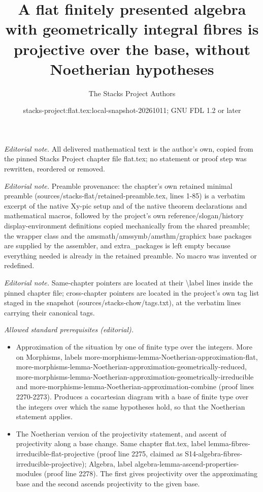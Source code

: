 \documentclass[10pt,a4paper]{amsart}
\title{A flat finitely presented algebra with geometrically integral fibres is projective over the base, without Noetherian hypotheses}
\author{The Stacks Project Authors}
\date{stacks-project:flat.tex:local-snapshot-20261011; GNU FDL 1.2 or later}
\theoremstyle{plain}
\theoremstyle{definition}
\theoremstyle{remark}
\numberwithin{equation}{subsection}
\begin{document}
\maketitle
\noindent\textit{Editorial note.} All delivered mathematical text is the author's own, copied from the pinned Stacks Project chapter file flat.tex; no statement or proof step was rewritten, reordered or removed.\par\medskip
\noindent\textit{Editorial note.} Preamble provenance: the chapter's own retained minimal preamble (sources/stacks-flat/retained-preamble.tex, lines 1-85) is a verbatim excerpt of the native Xy-pic setup and of the native theorem declarations and mathematical macros, followed by the project's own reference/slogan/history display-environment definitions copied mechanically from the shared preamble; the wrapper class and the amsmath/amssymb/amsthm/graphicx base packages are supplied by the assembler, and extra\_packages is left empty because everything needed is already in the retained preamble. No macro was invented or redefined.\par\medskip
\noindent\textit{Editorial note.} Same-chapter pointers are located at their \textbackslash{}label lines inside the pinned chapter file; cross-chapter pointers are located in the project's own tag list staged in the snapshot (sources/stacks-chow/tags.txt), at the verbatim lines carrying their canonical tags.\par\medskip
\noindent\textit{Allowed standard prerequisites (editorial).}\begin{itemize}
\item Approximation of the situation by one of finite type over the integers. More on Morphisms, labels more-morphisms-lemma-Noetherian-approximation-flat, more-morphisms-lemma-Noetherian-approximation-geometrically-reduced, more-morphisms-lemma-Noetherian-approximation-geometrically-irreducible and more-morphisms-lemma-Noetherian-approximation-combine (proof lines 2270-2273). Produces a cocartesian diagram with a base of finite type over the integers over which the same hypotheses hold, so that the Noetherian statement applies.
\item The Noetherian version of the projectivity statement, and ascent of projectivity along a base change. Same chapter flat.tex, label lemma-fibres-irreducible-flat-projective (proof line 2275, claimed as S14-algebra-fibres-irreducible-projective); Algebra, label algebra-lemma-ascend-properties-modules (proof line 2278). The first gives projectivity over the approximating base and the second ascends projectivity to the given base.
\end{itemize}\medskip
\end{document}

